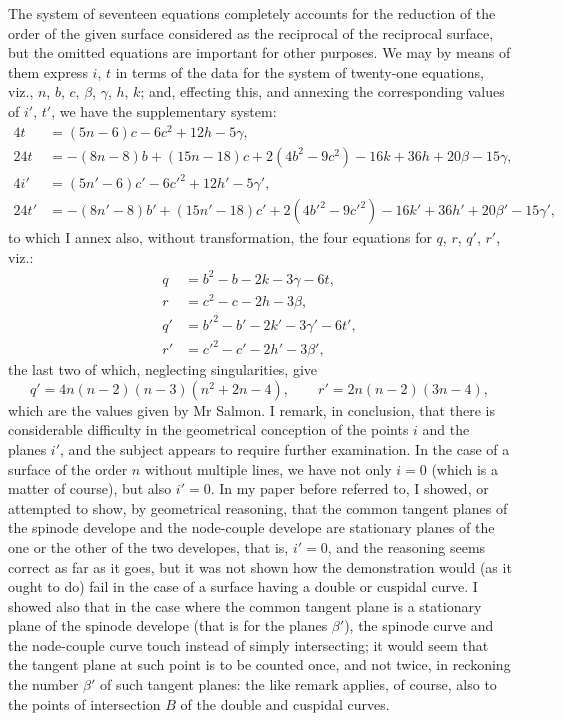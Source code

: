 \documentclass[11pt,a4paper]{book}
\theoremstyle{plain}
\begin{document}
The system of seventeen equations completely accounts for the reduction of the order of the given surface considered as the reciprocal of the reciprocal surface, but the omitted equations are important for other purposes. We may by means of them express $i$, $t$ in terms of the data for the system of twenty-one equations, viz., $n$, $b$, $c$, $\beta$, $\gamma$, $h$, $k$; and, effecting this, and annexing the corresponding values of $i'$, $t'$, we have the supplementary system:
\begin{align*}
4t &= (5n-6)c-6c^2+12h-5\gamma,\\
24t &= -(8n-8)b+(15n-18)c+2(4b^2-9c^2)-16k+36h+20\beta-15\gamma,\\
4i' &= (5n'-6)c'-6c'^2+12h'-5\gamma',\\
24t' &= -(8n'-8)b'+(15n'-18)c'+2(4b'^2-9c'^2)-16k'+36h'+20\beta'-15\gamma',
\end{align*}
to which I annex also, without transformation, the four equations for $q$, $r$, $q'$, $r'$, viz.:
\begin{align*}
q &= b^2-b-2k-3\gamma-6t,\\
r &= c^2-c-2h-3\beta,\\
q' &= b'^2-b'-2k'-3\gamma'-6t',\\
r' &= c'^2-c'-2h'-3\beta',
\end{align*}
the last two of which, neglecting singularities, give
\[
q'=4n(n-2)(n-3)(n^2+2n-4),\qquad r'=2n(n-2)(3n-4),
\]
which are the values given by Mr Salmon. I remark, in conclusion, that there is considerable difficulty in the geometrical conception of the points $i$ and the planes $i'$, and the subject appears to require further examination. In the case of a surface of the order $n$ without multiple lines, we have not only $i=0$ (which is a matter of course), but also $i'=0$. In my paper before referred to, I showed, or attempted to show, by geometrical reasoning, that the common tangent planes of the spinode develope and the node-couple develope are stationary planes of the one or the other of the two developes, that is, $i'=0$, and the reasoning seems correct as far as it goes, but it was not shown how the demonstration would (as it ought to do) fail in the case of a surface having a double or cuspidal curve. I showed also that in the case where the common tangent plane is a stationary plane of the spinode develope (that is for the planes $\beta'$), the spinode curve and the node-couple curve touch instead of simply intersecting; it would seem that the tangent plane at such point is to be counted once, and not twice, in reckoning the number $\beta'$ of such tangent planes: the like remark applies, of course, also to the points of intersection $B$ of the double and cuspidal curves.
\newpage
\end{document}
